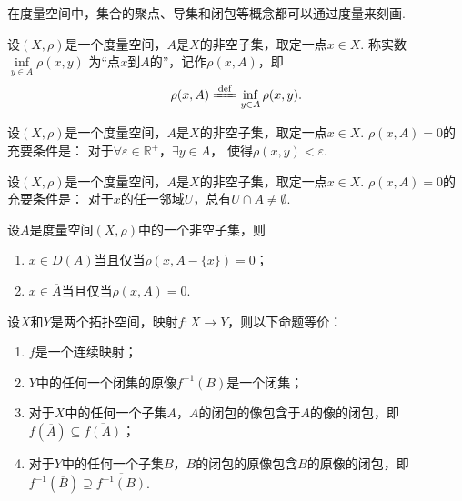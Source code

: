 在度量空间中，集合的聚点、导集和闭包等概念都可以通过度量来刻画.

\begin{definition}\label{definition:拓扑学.点到点集的距离}
\def\d{\inf\limits_{y \in A} \rho(x,y)}%
设\((X,\rho)\)是一个度量空间，\(A\)是\(X\)的非空子集，取定一点\(x \in X\).
称实数\(\d\)
为“点\(x\)到\(A\)的”，记作\(\rho(x,A)\)，即\[
\rho(x,A) \defeq \d.
\]
\end{definition}

\begin{theorem}
设\((X,\rho)\)是一个度量空间，\(A\)是\(X\)的非空子集，取定一点\(x \in X\).
\(\rho(x,A) = 0\)的充要条件是：
对于\(\forall\varepsilon\in\mathbb{R}^+\)，\(\exists y \in A\)，
使得\(\rho(x,y)<\varepsilon\).
\end{theorem}

\begin{corollary}
设\((X,\rho)\)是一个度量空间，\(A\)是\(X\)的非空子集，取定一点\(x \in X\).
\(\rho(x,A) = 0\)的充要条件是：
对于\(x\)的任一邻域\(U\)，总有\(U \cap A \neq \emptyset\).
\end{corollary}

\begin{theorem}
设\(A\)是度量空间\((X,\rho)\)中的一个非空子集，则
\begin{enumerate}
	\item \(x \in D(A)\)当且仅当\(\rho(x,A-\{x\})=0\)；
	\item \(x \in \overline{A}\)当且仅当\(\rho(x,A)=0\).
\end{enumerate}
\end{theorem}

\begin{theorem}
设\(X\)和\(Y\)是两个拓扑空间，映射\(f\colon X \to Y\)，则以下命题等价：
\begin{enumerate}
	\item \(f\)是一个连续映射；
	\item \(Y\)中的任何一个闭集的原像\(f^{-1}(B)\)是一个闭集；
	\item 对于\(X\)中的任何一个子集\(A\)，\(A\)的闭包的像包含于\(A\)的像的闭包，即\(f(\overline{A}) \subseteq \overline{f(A)}\)；
	\item 对于\(Y\)中的任何一个子集\(B\)，\(B\)的闭包的原像包含\(B\)的原像的闭包，即\(f^{-1}(\overline{B}) \supseteq \overline{f^{-1}(B)}\).
\end{enumerate}
\end{theorem}

